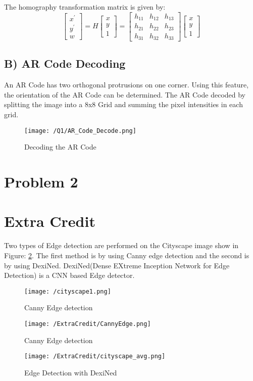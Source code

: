 \documentclass[a4paper, 10pt]{article}
\begin{document}
\begin{multicols}{2}
The homography transformation matrix is given by:
\[
\begin{bmatrix}
x^{'} \\
y^{'} \\
w
\end{bmatrix} =
H\begin{bmatrix}
x \\
y \\
1
\end{bmatrix} = 
\begin{bmatrix}
h_{11} & h_{12} & h_{13}\\
h_{21} & h_{22} & h_{23}\\
h_{31} & h_{32} & h_{33}
\end{bmatrix}
\begin{bmatrix}
x \\
y \\
1
\end{bmatrix}
\]

\subsection{B) AR Code Decoding}
An AR Code has two orthogonal protrusions on one corner. Using this feature, the orientation of the AR Code can be determined. The AR Code decoded by splitting the image into a 8x8 Grid and summing the pixel intensities in each grid.
\begin{figure}[H]
	\centering
	\texttt{[image: /Q1/AR\_Code\_Decode.png]}
	\caption{Decoding the AR Code}
	\label{fig:ARDecode}
\end{figure}


\section{Problem 2}


\section{Extra Credit}

Two types of Edge detection are performed on the Cityscape image show in Figure: \ref{fig:cityscape}. The first method is by using Canny edge detection and the second is by using DexiNed. DexiNed(Dense EXtreme Inception Network for Edge Detection) is a CNN based Edge detector.
\begin{figure}[H]
	\centering
	\texttt{[image: /cityscape1.png]}
	\caption{Canny Edge detection}
	\label{fig:cityscape}
\end{figure}


\begin{figure}[H]
	\centering
	\texttt{[image: /ExtraCredit/CannyEdge.png]}
	\caption{Canny Edge detection}
	\label{fig:Canny}
\end{figure}

\begin{figure}[H]
	\centering
	\texttt{[image: /ExtraCredit/cityscape\_avg.png]}
	\caption{Edge Detection with DexiNed}
	\label{fig:DexiNed}
\end{figure}
	
	
\end{multicols}
	
\end{document}
